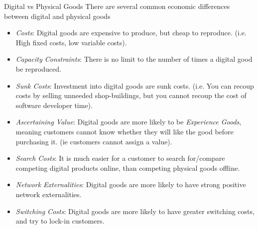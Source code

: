 \documentclass[11pt,a4paper]{article}
\begin{document}
  \begin{proposition}{Digital vs Physical Goods}
    There are several common economic differences between digital and physical goods
    \begin{itemize}
      \item \textit{Costs}: Digital goods are expensive to produce, but cheap to reproduce. (i.e. High fixed costs, low variable costs).
      \item \textit{Capacity Constraints}: There is no limit to the number of times a digital good be reproduced.
      \item \textit{Sunk Costs}: Investment into digital goods are sunk costs. (i.e. You can recoup costs by selling unneeded shop-buildings, but you cannot recoup the cost of software developer time).
      \item \textit{Ascertaining Value}: Digital goods are more likely to be \textit{Experience Goods}, meaning customers cannot know whether they will like the good before purchasing it. (ie customers cannot assign a value).
      \item \textit{Search Costs}: It is much easier for a customer to search for/compare competing digital products online, than competing physical goods offline.
      \item \textit{Network Externalities}: Digital goods are more likely to have strong positive network externalities.
      \item \textit{Switching Costs}: Digital goods are more likely to have greater switching costs, and try to lock-in customers.
    \end{itemize}
  \end{proposition}
\end{document}
